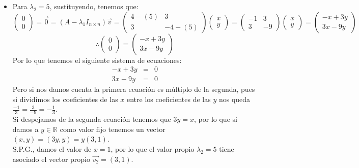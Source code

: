 \begin{itemize}
\begin{itemize}
\item Para $\lambda_2=5$, sustituyendo, tenemos que:
    \[\begin{pmatrix}0\\
0\end{pmatrix}=\vec{0}=(A-\lambda_1I_{n\times n })\vec{v}=\begin{pmatrix}4-(5) &3\\
3&-4-(5)\end{pmatrix}\begin{pmatrix}x\\
y\end{pmatrix}=\begin{pmatrix}-1 &3\\
3 &-9\end{pmatrix}\begin{pmatrix}x\\
y\end{pmatrix}=\begin{pmatrix}-x+3y\\
3x-9y\end{pmatrix}\]
\[\therefore \begin{pmatrix}0\\
0\end{pmatrix}=\begin{pmatrix}-x+3y\\
3x-9y\end{pmatrix}\]
Por lo que tenemos el siguiente sistema de ecuaciones:
\begin{eqnarray*}
-x+3y&=&0\\
3x-9y&=&0
\end{eqnarray*}
Pero si nos damos cuenta la primera ecuaci\'on es m\'ultiplo de la segunda, pues si dividimos los coeficientes de las $x$ entre los coeficientes de las $y$ nos queda $\displaystyle\frac{-1}{3}=\frac{3}{-9}=-\frac{1}{3}$.\\
Si despejamos de la segunda ecuaci\'on tenemos que $3y=x$, por lo que si damos a $y\in\mathbb{R}$ como valor fijo tenemos un vector $(x,y)=(3y,y)=y(3,1)$.\\
S.P.G., damos el valor de $x=1$, por lo que el valor propio $\lambda_2=5$ tiene asociado el vector propio $\vec{v_2}=(3,1)$.


\end{itemize}
\end{itemize}
